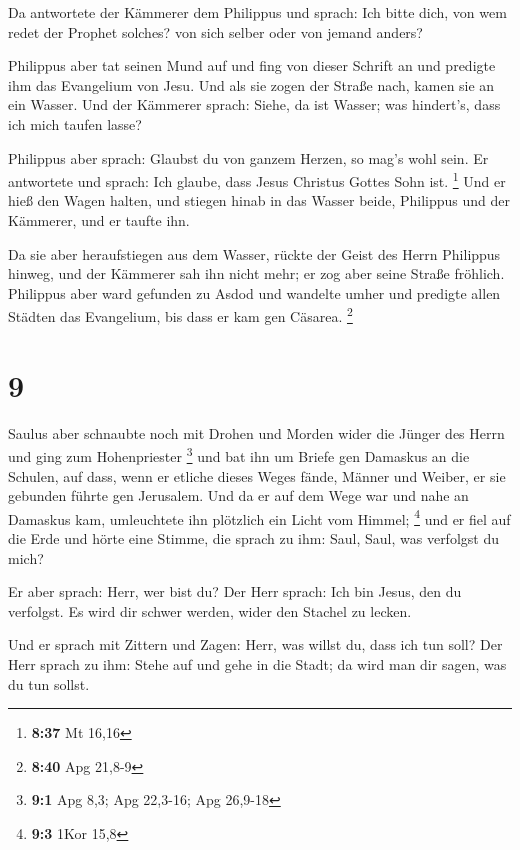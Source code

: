  Da antwortete der Kämmerer dem Philippus und sprach: Ich
bitte dich, von wem redet der Prophet solches? von sich selber oder von
jemand anders?

 Philippus aber tat seinen Mund auf und fing von dieser
Schrift an und predigte ihm das Evangelium von Jesu.  Und
als sie zogen der Straße nach, kamen sie an ein Wasser. Und der Kämmerer
sprach: Siehe, da ist Wasser; was hindert's, dass ich mich taufen lasse?

 Philippus aber sprach: Glaubst du von ganzem Herzen, so
mag's wohl sein. Er antwortete und sprach: Ich glaube, dass Jesus
Christus Gottes Sohn ist. \footnote{\textbf{8:37} Mt 16,16}
 Und er hieß den Wagen halten, und stiegen hinab in das
Wasser beide, Philippus und der Kämmerer, und er taufte ihn.

 Da sie aber heraufstiegen aus dem Wasser, rückte der Geist
des Herrn Philippus hinweg, und der Kämmerer sah ihn nicht mehr; er zog
aber seine Straße fröhlich.  Philippus aber ward gefunden
zu Asdod und wandelte umher und predigte allen Städten das Evangelium,
bis dass er kam gen Cäsarea. \footnote{\textbf{8:40} Apg 21,8-9}

\hypertarget{section-2}{%
\section{9}\label{section-2}}

 Saulus aber schnaubte noch mit Drohen und Morden wider die
Jünger des Herrn und ging zum Hohenpriester \footnote{\textbf{9:1} Apg
  8,3; Apg 22,3-16; Apg 26,9-18}  und bat ihn um Briefe gen
Damaskus an die Schulen, auf dass, wenn er etliche dieses Weges fände,
Männer und Weiber, er sie gebunden führte gen Jerusalem. 
Und da er auf dem Wege war und nahe an Damaskus kam, umleuchtete ihn
plötzlich ein Licht vom Himmel; \footnote{\textbf{9:3} 1Kor 15,8}
 und er fiel auf die Erde und hörte eine Stimme, die sprach
zu ihm: Saul, Saul, was verfolgst du mich?

 Er aber sprach: Herr, wer bist du? Der Herr sprach: Ich bin
Jesus, den du verfolgst. Es wird dir schwer werden, wider den Stachel zu
lecken.

 Und er sprach mit Zittern und Zagen: Herr, was willst du,
dass ich tun soll? Der Herr sprach zu ihm: Stehe auf und gehe in die
Stadt; da wird man dir sagen, was du tun sollst.

